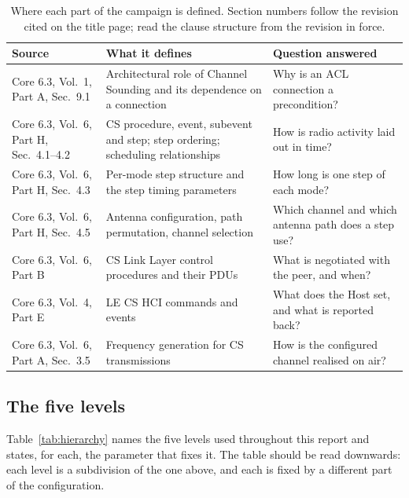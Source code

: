 \documentclass[11pt,a4paper]{article}
\begin{document}
\begin{table}[h]
\caption{Where each part of the campaign is defined. Section numbers follow the revision cited on the
title page; read the clause structure from the revision in force.}
\label{tab:sources}
\centering\small
\begin{tabular}{@{}L{46mm}L{50mm}L{45mm}@{}}
\toprule
Source & What it defines & Question answered \\
\midrule
Core 6.3, Vol.\ 1, Part A, Sec.\ 9.1
  & Architectural role of Channel Sounding and its dependence on a connection
  & Why is an ACL connection a precondition? \\
Core 6.3, Vol.\ 6, Part H, Sec.\ 4.1--4.2
  & CS procedure, event, subevent and step; step ordering; scheduling relationships
  & How is radio activity laid out in time? \\
Core 6.3, Vol.\ 6, Part H, Sec.\ 4.3
  & Per-mode step structure and the step timing parameters
  & How long is one step of each mode? \\
Core 6.3, Vol.\ 6, Part H, Sec.\ 4.5
  & Antenna configuration, path permutation, channel selection
  & Which channel and which antenna path does a step use? \\
Core 6.3, Vol.\ 6, Part B
  & CS Link Layer control procedures and their PDUs
  & What is negotiated with the peer, and when? \\
Core 6.3, Vol.\ 4, Part E
  & LE CS HCI commands and events
  & What does the Host set, and what is reported back? \\
Core 6.3, Vol.\ 6, Part A, Sec.\ 3.5
  & Frequency generation for CS transmissions
  & How is the configured channel realised on air? \\
\bottomrule
\end{tabular}
\end{table}

\subsection{The five levels}

Table~\ref{tab:hierarchy} names the five levels used throughout this report and states, for each,
the parameter that fixes it. The table should be read downwards: each level is a subdivision of the
one above, and each is fixed by a different part of the configuration.
\end{document}
